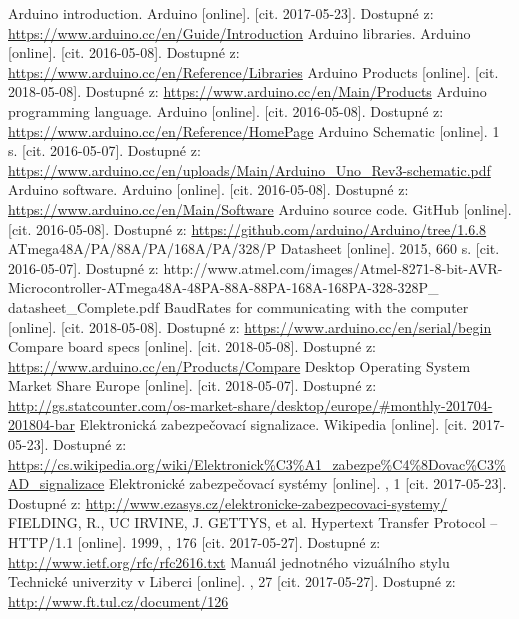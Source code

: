 \documentclass[FM,DP]{tulthesis}  %
\begin{document}


\begin{thebibliography}{10}
Arduino introduction. Arduino [online]. [cit. 2017-05-23]. Dostupné z: \url{https://www.arduino.cc/en/Guide/Introduction}
Arduino libraries. Arduino [online]. [cit. 2016-05-08]. Dostupné z: \url{https://www.arduino.cc/en/Reference/Libraries}
Arduino Products [online]. [cit. 2018-05-08]. Dostupné z: \url{https://www.arduino.cc/en/Main/Products}
Arduino programming language. Arduino [online]. [cit. 2016-05-08]. Dostupné z: \url{https://www.arduino.cc/en/Reference/HomePage}
Arduino Schematic [online]. 1 s. [cit. 2016-05-07]. Dostupné z: \url{https://www.arduino.cc/en/uploads/Main/Arduino\_Uno\_Rev3-schematic.pdf}
 Arduino software. Arduino [online]. [cit. 2016-05-08]. Dostupné z: \url{https://www.arduino.cc/en/Main/Software}
Arduino source code. GitHub [online]. [cit. 2016-05-08]. Dostupné z: \url{https://github.com/arduino/Arduino/tree/1.6.8}
ATmega48A/PA/88A/PA/168A/PA/328/P Datasheet [online]. 2015, 660 s. [cit. 2016-05-07]. Dostupné z: http://www.atmel.com/images/Atmel-8271-8-bit-AVR-Microcontroller-ATmega48A-48PA-88A-88PA-168A-168PA-328-328P\_ datasheet\_Complete.pdf
BaudRates for communicating with the computer [online]. [cit. 2018-05-08]. Dostupné z: \url{https://www.arduino.cc/en/serial/begin}
Compare board specs [online]. [cit. 2018-05-08]. Dostupné z: \url{https://www.arduino.cc/en/Products/Compare}
Desktop Operating System Market Share Europe [online]. [cit. 2018-05-07]. Dostupné z: \url{http://gs.statcounter.com/os-market-share/desktop/europe/#monthly-201704-201804-bar}
Elektronická zabezpečovací signalizace. Wikipedia [online]. [cit. 2017-05-23]. Dostupné z: \url{https://cs.wikipedia.org/wiki/Elektronick\%C3\%A1\_zabezpe\%C4\%8Dovac\%C3\%AD_signalizace}
Elektronické zabezpečovací systémy [online]. , 1 [cit. 2017-05-23]. Dostupné z: \url{http://www.ezasys.cz/elektronicke-zabezpecovaci-systemy/}
FIELDING, R., UC IRVINE, J. GETTYS, et al. Hypertext Transfer Protocol -- HTTP/1.1 [online]. 1999, , 176 [cit. 2017-05-27]. Dostupné z: \url{http://www.ietf.org/rfc/rfc2616.txt}
Manuál jednotného vizuálního stylu Technické univerzity v Liberci [online]. , 27 [cit. 2017-05-27]. Dostupné z: \url{http://www.ft.tul.cz/document/126}

\end{thebibliography}
\end{document}
